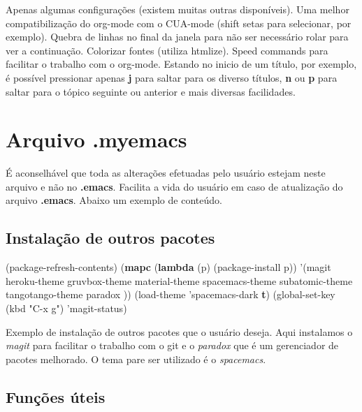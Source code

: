 \documentclass[]{article}
\newenvironment{Shaded}{}{}
\newcommand{\KeywordTok}[1]{\textcolor[rgb]{0.00,0.44,0.13}{\textbf{{#1}}}}
\newcommand{\StringTok}[1]{\textcolor[rgb]{0.25,0.44,0.63}{{#1}}}
\newcommand{\NormalTok}[1]{{#1}}
\begin{document}
Apenas algumas configurações (existem muitas outras disponíveis). Uma
melhor compatibilização do org-mode com o CUA-mode (shift setas para
selecionar, por exemplo). Quebra de linhas no final da janela para não
ser necessário rolar para ver a continuação. Colorizar fontes (utiliza
htmlize). Speed commands para facilitar o trabalho com o org-mode.
Estando no inicio de um título, por exemplo, é possível pressionar
apenas \textbf{j} para saltar para os diverso títulos, \textbf{n} ou
\textbf{p} para saltar para o tópico seguinte ou anterior e mais
diversas facilidades.

\section{Arquivo .myemacs}\label{arquivo-.myemacs}

É aconselhável que toda as alterações efetuadas pelo usuário estejam
neste arquivo e não no \textbf{.emacs}. Facilita a vida do usuário em
caso de atualização do arquivo \textbf{.emacs}. Abaixo um exemplo de
conteúdo.

\subsection{Instalação de outros
pacotes}\label{instalauxe7uxe3o-de-outros-pacotes}

\begin{Shaded}
\begin{Highlighting}[]
\NormalTok{(package-refresh-contents)}
\NormalTok{(}\KeywordTok{mapc} \NormalTok{(}\KeywordTok{lambda} \NormalTok{(p)}
    \NormalTok{(package-install p))}
      \NormalTok{'(magit}
        \NormalTok{heroku-theme}
    \NormalTok{gruvbox-theme}
        \NormalTok{material-theme }
    \NormalTok{spacemacs-theme}
    \NormalTok{subatomic-theme}
    \NormalTok{tangotango-theme}
    \NormalTok{paradox}
    \NormalTok{))}
\NormalTok{(load-theme 'spacemacs-dark }\KeywordTok{t}\NormalTok{)}
\NormalTok{(global-set-key (kbd }\StringTok{"C-x g"}\NormalTok{) 'magit-status)}
\end{Highlighting}
\end{Shaded}

Exemplo de instalação de outros pacotes que o usuário deseja. Aqui
instalamos o \emph{magit} para facilitar o trabalho com o git e o
\emph{paradox} que é um gerenciador de pacotes melhorado. O tema pare
ser utilizado é o \emph{spacemacs}.

\subsection{Funções úteis}\label{funuxe7uxf5es-uxfateis}
\end{document}
